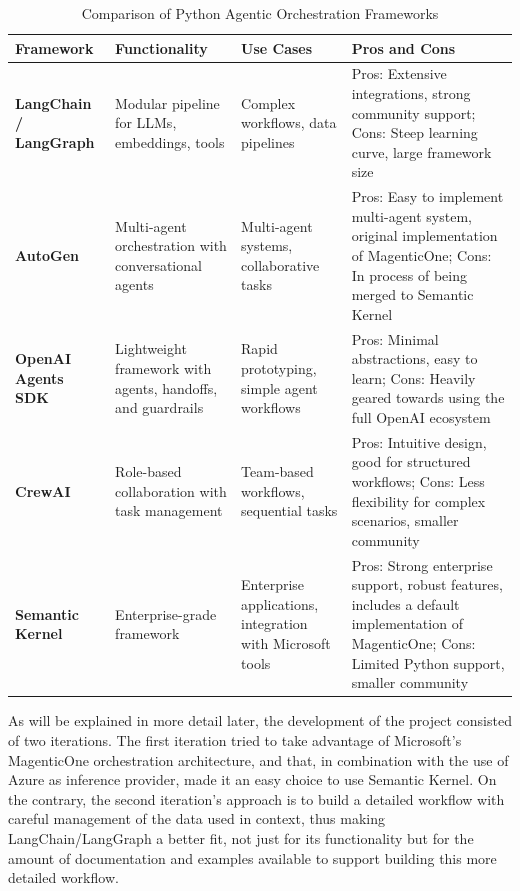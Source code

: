 \documentclass[a4paper]{report}
\begin{document}
\begin{table}[h]
\centering
\begin{tabular}{|p{3cm}|p{3cm}|p{3cm}|p{5.5cm}|}
\hline
\textbf{Framework} & \textbf{Functionality} & \textbf{Use Cases} & \textbf{Pros and Cons} \\ \hline
\textbf{LangChain / LangGraph} & Modular pipeline for LLMs, embeddings, tools & Complex workflows, data pipelines & Pros: Extensive integrations, strong community support; Cons: Steep learning curve, large framework size \\ \hline
\textbf{AutoGen} & Multi-agent orchestration with conversational agents & Multi-agent systems, collaborative tasks & Pros: Easy to implement multi-agent system, original implementation of MagenticOne; Cons: In process of being merged to Semantic Kernel \\ \hline
\textbf{OpenAI Agents SDK} & Lightweight framework with agents, handoffs, and guardrails & Rapid prototyping, simple agent workflows & Pros: Minimal abstractions, easy to learn; Cons: Heavily geared towards using the full OpenAI ecosystem \\ \hline
\textbf{CrewAI} & Role-based collaboration with task management & Team-based workflows, sequential tasks & Pros: Intuitive design, good for structured workflows; Cons: Less flexibility for complex scenarios, smaller community \\ \hline
\textbf{Semantic Kernel} & Enterprise-grade framework & Enterprise applications, integration with Microsoft tools & Pros: Strong enterprise support, robust features, includes a default implementation of MagenticOne; Cons: Limited Python support, smaller community \\ \hline
\end{tabular}
\caption{Comparison of Python Agentic Orchestration Frameworks}
\label{tab:orchestration_frameworks_uses}
\end{table}

As will be explained in more detail later, the development of the project consisted of two iterations. The first iteration tried to take advantage of Microsoft's MagenticOne orchestration architecture, and that, in combination with the use of Azure as inference provider, made it an easy choice to use Semantic Kernel. On the contrary, the second iteration's approach is to build a detailed workflow with careful management of the data used in context, thus making LangChain/LangGraph a better fit, not just for its functionality but for the amount of documentation and examples available to support building this more detailed workflow.
\end{document}
